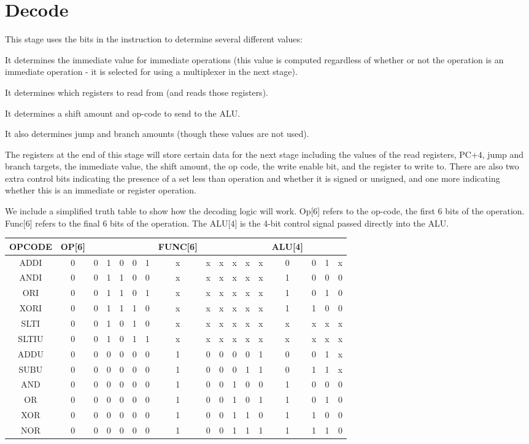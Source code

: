 \documentclass{article}
\begin{document}
\section*{Decode}
This stage uses the bits in the instruction to determine several different values:

It determines the immediate value for immediate operations (this value is computed regardless of whether or not the operation is an immediate operation - it is selected for using a multiplexer in the next stage).

It determines which registers to read from (and reads those registers).

It determines a shift amount and op-code to send to the ALU.

It also determines jump and branch amounts (though these values are not used).

The registers at the end of this stage will store certain data for the next stage including the values of the read registers, PC$+4$, jump and branch targets, the immediate value, the shift amount, the op code, the write enable bit, and the register to write to. There are also two extra control bits indicating the presence of a set less than operation and whether it is signed or unsigned, and one more indicating whether this is an immediate or register operation. 

We include a simplified truth table to show how the decoding logic will work. Op[6] refers to the op-code, the first 6 bits of the operation. Func[6] refers to the final 6 bits of the operation. The ALU[4] is the 4-bit control signal passed directly into the ALU. 

\begin{tabular}{| c | c  c  c  c  c  c | c c c c c c | c c c c |}
\hline
OPCODE & OP[6] &&&&&& FUNC[6] &&&&&& ALU[4] &&&\\
\hline
ADDI	&0	&0	&1	&0	&0	&1	&x	&x	&x	&x	&x	&x	&0	&0	&1	&x \\
ANDI	&0	&0	&1	&1	&0	&0	&x	&x	&x	&x	&x	&x	&1	&0	&0	&0 \\
ORI		&0	&0	&1	&1	&0	&1	&x	&x	&x	&x	&x	&x	&1	&0	&1	&0 \\
XORI	&0	&0	&1	&1	&1	&0	&x	&x	&x	&x	&x	&x	&1	&1	&0	&0 \\
SLTI		&0	&0	&1	&0	&1	&0	&x	&x	&x	&x	&x	&x	&x	&x	&x	&x \\
SLTIU	&0	&0	&1	&0	&1	&1	&x	&x	&x	&x	&x	&x	&x	&x	&x	&x\\
\hline
ADDU	&0	&0	&0	&0	&0	&0	&1	&0	&0	&0	&0	&1	&0	&0	&1	&x\\
SUBU	&0	&0	&0	&0	&0	&0	&1	&0	&0	&0	&1	&1	&0	&1	&1	&x\\
AND		&0	&0	&0	&0	&0	&0	&1	&0	&0	&1	&0	&0	&1	&0	&0	&0\\
OR		&0	&0	&0	&0	&0	&0	&1	&0	&0	&1	&0	&1	&1	&0	&1	&0\\
XOR		&0	&0	&0	&0	&0	&0	&1	&0	&0	&1	&1	&0	&1	&1	&0	&0\\
NOR		&0	&0	&0	&0	&0	&0	&1	&0	&0	&1	&1	&1	&1	&1	&1	&0\\
\hline
\end{tabular}
\end{document}
